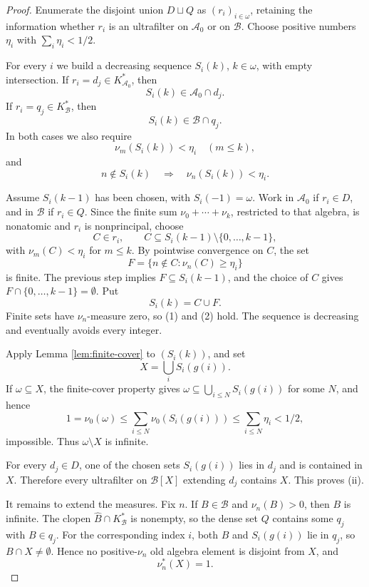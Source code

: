 \documentclass[11pt]{amsart}
\theoremstyle{definition}
\newcommand{\A}{\mathcal A}
\newcommand{\B}{\mathcal B}
\newcommand{\wh}{\widehat}
\begin{document}
\begin{proof}
Enumerate the disjoint union \(D\sqcup Q\) as \((r_i)_{i\in\omega}\), retaining
the information whether \(r_i\) is an ultrafilter on \(\A_0\) or on \(\B\).
Choose positive numbers \(\eta_i\) with \(\sum_i\eta_i<1/2\).

For every \(i\) we build a decreasing sequence \(S_i(k)\), \(k\in\omega\), with
empty intersection.  If \(r_i=d_j\in K_{\A_0}^*\), then
\[
        S_i(k)\in\A_0\cap d_j .
\]
If \(r_i=q_j\in K_\B^*\), then
\[
        S_i(k)\in\B\cap q_j .
\]
In both cases we also require
\[
        \nu_m(S_i(k))<\eta_i\quad(m\le k),                 \tag{1}
\]
and
\[
        n\notin S_i(k)\quad\Longrightarrow\quad
        \nu_n(S_i(k))<\eta_i .                              \tag{2}
\]

Assume \(S_i(k-1)\) has been chosen, with \(S_i(-1)=\omega\).  Work in
\(\A_0\) if \(r_i\in D\), and in \(\B\) if \(r_i\in Q\).  Since the finite sum
\(\nu_0+\cdots+\nu_k\), restricted to that algebra, is nonatomic and \(r_i\) is
nonprincipal, choose
\[
        C\in r_i,\qquad
        C\subseteq S_i(k-1)\setminus\{0,\ldots,k-1\},
\]
with \(\nu_m(C)<\eta_i\) for \(m\le k\).  By pointwise convergence on \(C\),
the set
\[
        F=\{n\notin C:\nu_n(C)\ge\eta_i\}
\]
is finite.  The previous step implies \(F\subseteq S_i(k-1)\), and the choice
of \(C\) gives \(F\cap\{0,\ldots,k-1\}=\emptyset\).  Put
\[
        S_i(k)=C\cup F .
\]
Finite sets have \(\nu_n\)-measure zero, so (1) and (2) hold.  The sequence is
decreasing and eventually avoids every integer.

Apply Lemma \ref{lem:finite-cover} to \((S_i(k))\), and set
\[
        X=\bigcup_i S_i(g(i)).
\]
If \(\omega\subseteq X\), the finite-cover property gives
\(\omega\subseteq\bigcup_{i\le N}S_i(g(i))\) for some \(N\), and hence
\[
        1=\nu_0(\omega)\le \sum_{i\le N}\nu_0(S_i(g(i)))
        \le \sum_{i\le N}\eta_i<1/2,
\]
impossible.  Thus \(\omega\setminus X\) is infinite.

For every \(d_j\in D\), one of the chosen sets \(S_i(g(i))\) lies in \(d_j\)
and is contained in \(X\).  Therefore every ultrafilter on \(\B[X]\) extending
\(d_j\) contains \(X\).  This proves (ii).

It remains to extend the measures.  Fix \(n\).  If \(B\in\B\) and
\(\nu_n(B)>0\), then \(B\) is infinite.  The clopen \(\wh B\cap K_\B^*\) is
nonempty, so the dense set \(Q\) contains some \(q_j\) with \(B\in q_j\).
For the corresponding index \(i\), both \(B\) and \(S_i(g(i))\) lie in
\(q_j\), so \(B\cap X\ne\emptyset\).  Hence no positive-\(\nu_n\) old algebra
element is disjoint from \(X\), and
\[
        \nu_n^*(X)=1 .                                      \tag{3}
\]


\end{proof}
\end{document}
